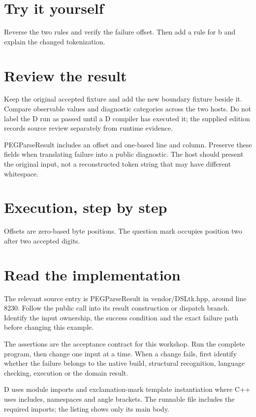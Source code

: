 \section*{Try it yourself}
Reverse the two rules and verify the failure offset. Then add a rule for b and explain the changed tokenization.

\section*{Review the result}
Keep the original accepted fixture and add the new boundary fixture beside it. Compare observable values and diagnostic categories across the two hosts. Do not label the D run as passed until a D compiler has executed it; the supplied edition records source review separately from runtime evidence.

\clearpage
{}
PEGParseResult includes an offset and one-based line and column. Preserve these fields when translating failure into a public diagnostic. The host should present the original input, not a reconstructed token string that may have different whitespace.


\section*{Execution, step by step}
Offsets are zero-based byte positions. The question mark occupies position two after two accepted digits.

\section*{Read the implementation}
The relevant source entry is PEGParseResult in vendor/DSLtk.hpp, around line 8230. Follow the public call into its result construction or dispatch branch. Identify the input ownership, the success condition and the exact failure path before changing this example.

The assertions are the acceptance contract for this workshop. Run the complete program, then change one input at a time. When a change fails, first identify whether the failure belongs to the native build, structural recognition, language checking, execution or the domain result.

\clearpage
{}
D uses module imports and exclamation-mark template instantiation where C++ uses includes, namespaces and angle brackets. The runnable file includes the required imports; the listing shows only its main body.

